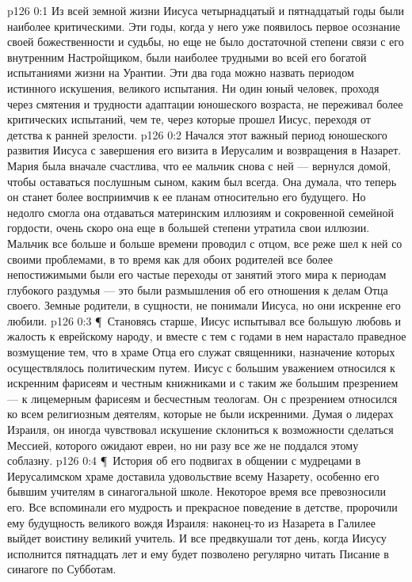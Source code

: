 \vs p126 0:1 Из всей земной жизни Иисуса четырнадцатый и пятнадцатый годы были наиболее критическими. Эти годы, когда у него уже появилось первое осознание своей божественности и судьбы, но еще не было достаточной степени связи с его внутренним Настройщиком, были наиболее трудными во всей его богатой испытаниями жизни на Урантии. Эти два года можно назвать периодом истинного искушения, великого испытания. Ни один юный человек, проходя через смятения и трудности адаптации юношеского возраста, не переживал более критических испытаний, чем те, через которые прошел Иисус, переходя от детства к ранней зрелости.
\vs p126 0:2 Начался этот важный период юношеского развития Иисуса с завершения его визита в Иерусалим и возвращения в Назарет. Мария была вначале счастлива, что ее мальчик снова с ней --- вернулся домой, чтобы оставаться послушным сыном, каким был всегда. Она думала, что теперь он станет более восприимчив к ее планам относительно его будущего. Но недолго смогла она отдаваться материнским иллюзиям и сокровенной семейной гордости, очень скоро она еще в большей степени утратила свои иллюзии. Мальчик все больше и больше времени проводил с отцом, все реже шел к ней со своими проблемами, в то время как для обоих родителей все более непостижимыми были его частые переходы от занятий этого мира к периодам глубокого раздумья --- это были размышления об его отношения к делам Отца своего. Земные родители, в сущности, не понимали Иисуса, но они искренне его любили.
\vs p126 0:3 \P\ Становясь старше, Иисус испытывал все большую любовь и жалость к еврейскому народу, и вместе с тем с годами в нем нарастало праведное возмущение тем, что в храме Отца его служат священники, назначение которых осуществлялось политическим путем. Иисус с большим уважением относился к искренним фарисеям и честным книжниками и с таким же большим презрением --- к лицемерным фарисеям и бесчестным теологам. Он с презрением относился ко всем религиозным деятелям, которые не были искренними. Думая о лидерах Израиля, он иногда чувствовал искушение склониться к возможности сделаться Мессией, которого ожидают евреи, но ни разу все же не поддался этому соблазну.
\vs p126 0:4 \P\ История об его подвигах в общении с мудрецами в Иерусалимском храме доставила удовольствие всему Назарету, особенно его бывшим учителям в синагогальной школе. Некоторое время все превозносили его. Все вспоминали его мудрость и прекрасное поведение в детстве, пророчили ему будущность великого вождя Израиля: наконец\hyp{}то из Назарета в Галилее выйдет воистину великий учитель. И все предвкушали тот день, когда Иисусу исполнится пятнадцать лет и ему будет позволено регулярно читать Писание в синагоге по Субботам.
